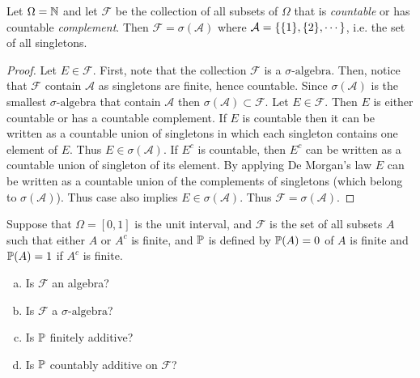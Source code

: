 \begin{proposition}
	Let $ \Omega = \mathbb{N} $ and let $ \mathcal{F} $ be the collection of all subsets of $ \Omega $ that is \emph{countable} or has countable \emph{complement}. Then $ \mathcal{F} = \sigma(\mathcal{A}) $ where $ \mathcal{A} = \{\{1\},\{2\},\cdots\} $, i.e. the set of all singletons.
\end{proposition}
\begin{proof}
	Let $ E \in \mathcal{F} $. First, note that the collection $ \mathcal{F} $ is a $\sigma\text{-algebra}$. Then, notice that $ \mathcal{F} $ contain $ \mathcal{A} $ as singletons are finite, hence countable. Since $ \sigma(\mathcal{A}) $ is the smallest $\sigma\text{-algebra}$ that contain $ \mathcal{A} $ then $ \sigma(\mathcal{A})\subset \mathcal{F} $. Let $ E \in \mathcal{F} $. Then $ E $ is either countable or has a countable complement. If $ E $ is countable then it can be written as a countable union of singletons in which each singleton contains one element of $ E $. Thus $ E \in \sigma(\mathcal{A}) $. If $ E^c $ is countable, then $ E^c $ can be written as a countable union of singleton of its element. By applying De Morgan's law $ E $ can be written as a countable union of the complements of singletons (which belong to $ \sigma(\mathcal{A}) $). Thus case also implies $ E \in \sigma(\mathcal{A}) $. Thus $ \mathcal{F} = \sigma(\mathcal{A}) $.
\end{proof}

\begin{problem}
	Suppose that $ \Omega = [0,1] $ is the unit interval, and $ \mathcal{F} $ is the set of all subsets $  A $ such that either $ A $ or $ A^c $ is finite, and $ \mathbb{P} $ is defined by $ \mathbb{P}(A) = 0 $ of $ A $ is finite and $ \mathbb{P}(A) = 1 $ if $ A^c $ is finite. 
	\begin{enumerate}[(a)]
		\item Is $ \mathcal{F} $ an algebra?
		\item Is $ \mathcal{F} $ a $\sigma\text{-algebra}$?
		\item Is $ \mathbb{P} $ finitely additive?
		\item Is $ \mathbb{P} $ countably additive on $ \mathcal{F} $?
	\end{enumerate}
\end{problem}

